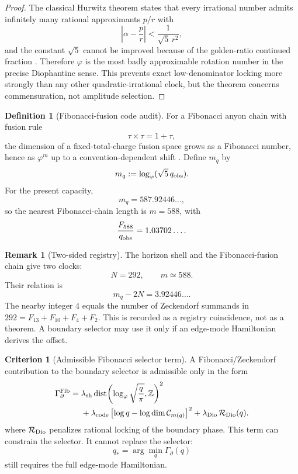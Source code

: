 \documentclass[aps,prd,reprint,nofootinbib,superscriptaddress,floatfix]{revtex4-2}
\numberwithin{equation}{section}
\theoremstyle{definition}
\newtheorem{definition}{Definition}[section]
\newtheorem{criterion}{Criterion}[section]
\newtheorem{remark}{Remark}[section]
\theoremstyle{plain}
\begin{document}
\begin{proof}
The classical Hurwitz theorem states that every irrational number admits
infinitely many rational approximants \(p/r\) with
\[
\left|\alpha-\frac pr\right|<\frac{1}{\sqrt5\,r^2},
\]
and the constant \(\sqrt5\) cannot be improved because of the golden-ratio
continued fraction \cite{HardyWright2008}.  Therefore \(\varphi\) is the
most badly approximable rotation number in the precise Diophantine sense.
This prevents exact low-denominator locking more strongly than any other
quadratic-irrational clock, but the theorem concerns commensuration, not
amplitude selection.
\end{proof}

\begin{definition}[Fibonacci-fusion code audit]
For a Fibonacci anyon chain with fusion rule
\[
\tau\times\tau=1+\tau,
\]
the dimension of a fixed-total-charge fusion space grows as a Fibonacci
number, hence as \(\varphi^m\) up to a convention-dependent shift
\cite{NayakEtAl2008}.  Define \(m_q\) by
\begin{equation}
m_q:=\log_\varphi(\sqrt5\,q_{\rm obs}).
\end{equation}
For the present capacity,
\begin{equation}
m_q=587.92446\ldots ,
\end{equation}
so the nearest Fibonacci-chain length is \(m=588\), with
\begin{equation}
\frac{F_{588}}{q_{\rm obs}}=1.03702\ldots .
\end{equation}
\end{definition}

\begin{remark}[Two-sided registry]
The horizon shell and the Fibonacci-fusion chain give two clocks:
\[
N=292,\qquad m\simeq588.
\]
Their relation is
\[
m_q-2N=3.92446\ldots .
\]
The nearby integer \(4\) equals the number of Zeckendorf summands in
\(292=F_{13}+F_{10}+F_4+F_2\).  This is recorded as a registry coincidence,
not as a theorem.  A boundary selector may use it only if an edge-mode
Hamiltonian derives the offset.
\end{remark}

\begin{criterion}[Admissible Fibonacci selector term]
A Fibonacci/Zeckendorf contribution to the boundary selector is admissible
only in the form
\begin{align}
\Gamma_\partial^{\rm Fib}
={}&
\lambda_{\rm sh}
\operatorname{dist}\!\left(
\log_\varphi\sqrt{\frac{q}{\pi}},\mathbb Z
\right)^2 \nonumber\\
&+
\lambda_{\rm code}
\left[
\log q-\log \dim{\mathcal C}_{m(q)}
\right]^2
+\lambda_{\rm Dio}\,{\mathcal R}_{\rm Dio}(q).
\end{align}
where \({\mathcal R}_{\rm Dio}\) penalizes rational locking of the boundary
phase.  This term can constrain the selector.  It cannot replace the
selector:
\[
q_*=\arg\min_q\Gamma_\partial(q)
\]
still requires the full edge-mode Hamiltonian.
\end{criterion}
\end{document}
